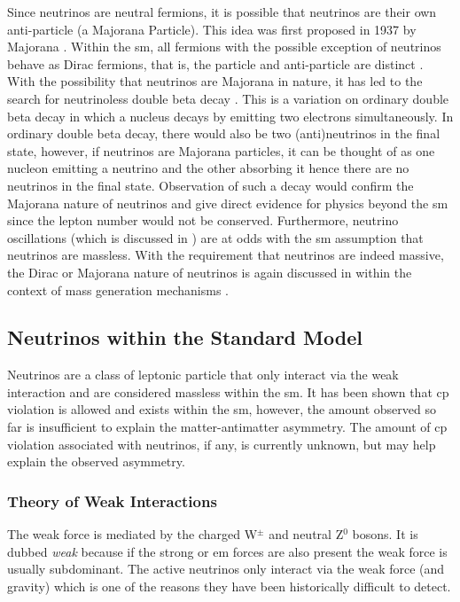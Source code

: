 Since neutrinos are neutral fermions, it is possible that neutrinos are their own anti-particle (a Majorana Particle). This idea was first proposed in 1937 by Majorana \cite{Majorana2020}. Within the \Gls{sm}, all fermions with the possible exception of neutrinos behave as Dirac fermions, that is, the particle and anti-particle are distinct \cite{dirac_majorana_neutrinos}. With the possibility that neutrinos are Majorana in nature, it has led to the search for neutrinoless double beta decay \cite{Double_beta_decay}. This is a variation on ordinary double beta decay in which a nucleus decays by emitting two electrons simultaneously. In ordinary double beta decay, there would also be two (anti)neutrinos in the final state, however, if neutrinos are Majorana particles, it can be thought of as one nucleon emitting a neutrino and the other absorbing it hence there are no neutrinos in the final state. Observation of such a decay would confirm the Majorana nature of neutrinos and give direct evidence for physics beyond the \Gls{sm} since the lepton number would not be conserved. Furthermore, neutrino oscillations (which is discussed in ) are at odds with the \gls{sm} assumption that neutrinos are massless. With the requirement that neutrinos are indeed massive, the Dirac or Majorana nature of neutrinos is again discussed in  within the context of mass generation mechanisms \cite{The_physics_of_neutrinos_book}.

\subsection{Neutrinos within the Standard Model}

Neutrinos are a class of leptonic particle that only interact via the weak interaction and are considered massless within the \gls{sm}. It has been shown that \gls{cp} violation is allowed and exists within the \gls{sm}, however, the amount observed so far is insufficient to explain the matter-antimatter asymmetry. The amount of \gls{cp} violation associated with neutrinos, if any, is currently unknown, but may help explain the observed asymmetry. 

\subsubsection{Theory of Weak Interactions}\label{subsubsec:Theory of Weak Interactions}
The weak force is mediated by the charged W$^\pm$ and neutral Z$^0$ bosons. It is dubbed \textit{weak} because if the strong or \gls{em} forces are also present the weak force is usually subdominant. The active neutrinos only interact via the weak force (and gravity) which is one of the reasons they have been historically difficult to detect. 

